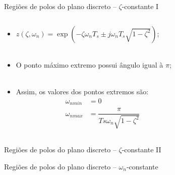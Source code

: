 \documentclass[aspectratio=169,11pt,t,xcolor={usenames,dvipsnames,x11names}]{beamer}
\begin{document}
\begin{frame}[c]{Regiões de polos do plano discreto -- $\zeta$-constante I}
	\begin{columns}
		\begin{column}{0.5\textwidth}
			\small
			\begin{itemize}
				\item $z(\zeta,\omega_n) = \exp{\left(-\zeta\omega_nT_s \pm j\omega_nT_s\sqrt{1-\zeta^2}\right)}$;\\~\\
				\item O ponto máximo extremo possui ângulo igual à $\pi$;\\~\\
				\item Assim, os valores dos pontos extremos são:
				\begin{subequations}
					\begin{align}
						\omega_{nmin} &= 0\\
						\omega_{nmax} &= \dfrac{\pi}{Ts\omega_n\sqrt{1-\zeta^2}}
					\end{align}
				\end{subequations}
			\end{itemize}
		\end{column}
		\begin{column}{0.5\textwidth}
			\begin{figure}[!ht]
				\centering
					
			\end{figure}
		\end{column}
	\end{columns}
\end{frame}

\begin{frame}[c]{Regiões de polos do plano discreto -- $\zeta$-constante II}
	\begin{figure}[!ht]
		\centering
		\begin{subfigure}[t]{0.4\columnwidth}
				
		\end{subfigure}
		\begin{subfigure}[t]{0.4\columnwidth}
				
		\end{subfigure}
	\end{figure}
\end{frame}

\begin{frame}[c]{Regiões de polos do plano discreto -- $\omega_n$-constante}
	\begin{figure}[!ht]
		\centering
		\begin{subfigure}[t]{0.45\columnwidth}
				
		\end{subfigure}
		\begin{subfigure}[t]{0.45\columnwidth}
				
		\end{subfigure}
	\end{figure}
\end{frame}
\end{document}
